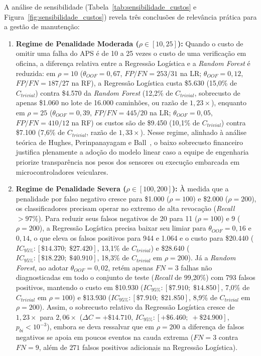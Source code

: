 \documentclass[conference]{IEEEtran}
\begin{document}
A análise de sensibilidade (Tabela~\ref{tab:sensibilidade_custos} e Figura~\ref{fig:sensibilidade_custos}) revela três conclusões de relevância prática para a gestão de manutenção:
\begin{enumerate}
    \item \textbf{Regime de Penalidade Moderada ($\rho \in [10, 25]$):} Quando o custo de omitir uma falha do APS é de 10 a 25 vezes o custo de uma verificação em oficina, a diferença relativa entre a Regressão Logística e a \textit{Random Forest} é reduzida: em $\rho = 10$ ($\theta_{OOF}=0{,}67$, $FP/FN = 253/31$ na LR; $\theta_{OOF}=0{,}12$, $FP/FN = 187/27$ na RF), a Regressão Logística custa \$5.630 (15,0\% de $C_{trivial}$) contra \$4.570 da \textit{Random Forest} (12,2\% de $C_{trivial}$, sobrecusto de apenas \$1.060 no lote de 16.000 caminhões, ou razão de $1{,}23\times$), enquanto em $\rho = 25$ ($\theta_{OOF}=0{,}39$, $FP/FN=445/20$ na LR; $\theta_{OOF}=0{,}05$, $FP/FN=410/12$ na RF) os custos são de \$9.450 (10,1\% de $C_{trivial}$) contra \$7.100 (7,6\% de $C_{trivial}$, razão de $1{,}33\times$). Nesse regime, alinhado à análise teórica de Hughes, Perinpanayagam e Ball~\cite{hughes2025xai}, o baixo sobrecusto financeiro justifica plenamente a adoção do modelo linear caso a equipe de engenharia priorize transparência nos pesos dos sensores ou execução embarcada em microcontroladores veiculares.
    \item \textbf{Regime de Penalidade Severa ($\rho \in [100, 200]$):} À medida que a penalidade por falso negativo cresce para \$1.000 ($\rho = 100$) e \$2.000 ($\rho = 200$), os classificadores precisam operar no extremo de alta revocação (\textit{Recall} $> 97\%$). Para reduzir seus falsos negativos de 20 para 11 ($\rho=100$) e 9 ($\rho=200$), a Regressão Logística precisa baixar seu limiar para $\theta_{OOF} = 0{,}16$ e $0{,}14$, o que eleva os falsos positivos para 944 e 1.064 e o custo para \$20.440 ($IC_{95\%}: [\$14.370;\; \$27.420]$, 13,1\% de $C_{trivial}$) e \$28.640 ($IC_{95\%}: [\$18.220;\; \$40.910]$, 18,3\% de $C_{trivial}$ em $\rho=200$). Já a \textit{Random Forest}, ao adotar $\theta_{OOF} = 0{,}02$, retém apenas $FN = 3$ falhas não diagnosticadas em todo o conjunto de teste (\textit{Recall} de 99,20\%) com 793 falsos positivos, mantendo o custo em \$10.930 ($IC_{95\%}: [\$7.910;\; \$14.850]$, 7,0\% de $C_{trivial}$ em $\rho=100$) e \$13.930 ($IC_{95\%}: [\$7.910;\; \$21.850]$, 8,9\% de $C_{trivial}$ em $\rho=200$). Assim, o sobrecusto relativo da Regressão Logística cresce de $1{,}23\times$ para \textbf{$2{,}06\times$} ($\Delta C = +\$14.710$, $IC_{95\%}: [+\$6.460;\; +\$24.900]$, $p_{bi} < 10^{-3}$), embora se deva ressalvar que em $\rho = 200$ a diferença de falsos negativos se apoia em poucos eventos na cauda extrema ($FN = 3$ contra $FN = 9$, além de $271$ falsos positivos adicionais na Regressão Logística).

\end{enumerate}
\end{document}
